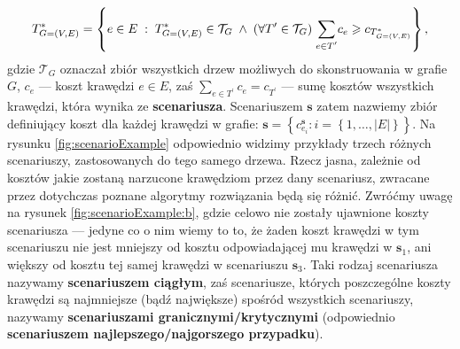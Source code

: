 \begin{equation}
	T^{\ast}_{G = \left( V, E \right)} = \left\{ e \in E \; : \; T^{\ast}_{G = \left( V, E \right)} \in \mathcal{T}_{G} \; \wedge \; \left( \forall T^{\prime} \in \mathcal{T}_{G} \right) \; \sum_{ \mathclap{e \in T^{\prime} }} c_{e} \geqslant c_{ T^{\ast}_{ G = \left( V, E \right) } } \right\}\text{,}
\end{equation}
gdzie $\mathcal{T}_{G}$ oznaczał zbiór wszystkich drzew możliwych do skonstruowania w grafie $G$, $c_{e}$ --- koszt krawędzi $e \in E$, zaś $\sum_{ e \in T^{\prime} } c_{e} = c_{T^{\prime}}$ --- sumę kosztów wszystkich krawędzi, która wynika ze \textbf{scenariusza}. Scenariuszem $\textbf{s}$ zatem nazwiemy zbiór definiujący koszt dla każdej krawędzi w grafie: $\textbf{s} = \left\{ c^{\textbf{s}}_{e_{i}} : i = \left\{ 1, \dots, \left| E \right| \right\} \right\}$. Na rysunku \ref{fig:scenarioExample} odpowiednio widzimy przykłady trzech różnych scenariuszy, zastosowanych do tego samego drzewa. Rzecz jasna, zależnie od kosztów jakie zostaną narzucone krawędziom przez dany scenariusz, zwracane przez dotychczas poznane algorytmy rozwiązania będą się różnić. Zwróćmy uwagę na rysunek \ref{fig:scenarioExample:b}, gdzie celowo nie zostały ujawnione koszty scenariusza --- jedyne co o nim wiemy to to, że żaden koszt krawędzi w tym scenariuszu nie jest mniejszy od kosztu odpowiadającej mu krawędzi w $\textbf{s}_{1}$, ani większy od kosztu tej samej krawędzi w scenariuszu $\textbf{s}_{3}$. Taki rodzaj scenariusza nazywamy \textbf{scenariuszem ciągłym}, zaś scenariusze, których poszczególne koszty krawędzi są najmniejsze (bądź największe) spośród wszystkich scenariuszy, nazywamy \textbf{scenariuszami granicznymi/krytycznymi} (odpowiednio \textbf{scenariuszem najlepszego/najgorszego przypadku}).


